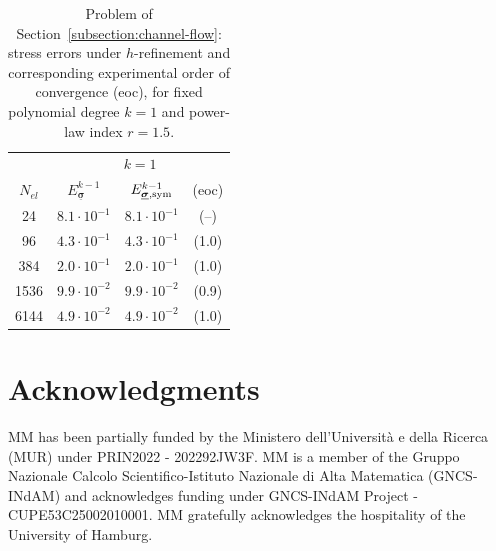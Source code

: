\documentclass[a4paper,twoside,10pt]{article}
\theoremstyle{plain}
\theoremstyle{remark}
\theoremstyle{definition}
\numberwithin{equation}{section}
\numberwithin{figure}{section}
\newcommand{\sigmabf}{\underline{\boldsymbol{\sigma}}}
\newcommand{\Ekmosigmasym}{E_{\sigmabf,\rm{sym}}^{k-1}}
\newcommand{\Ekmosigma}{E_{\sigmabf}^{k-1}}
\newcommand{\Nel}{N_{el}}
\begin{document}
\begin{table}[htbp]
\centering
\begin{tabular}{c|ccc}
\toprule
& \multicolumn{3}{c}{$k=1$}\\
$\Nel$
& $\Ekmosigma$
& $\Ekmosigmasym$
& (eoc) \\
\midrule
24
& $8.1\cdot10^{-1}$ & $8.1\cdot10^{-1}$ & (--)\\

96
& $4.3\cdot10^{-1}$ & $4.3\cdot10^{-1}$ & (1.0) \\

384
& $2.0\cdot10^{-1}$ & $2.0\cdot10^{-1}$ & (1.0) \\

1536
& $9.9\cdot10^{-2}$ & $9.9\cdot10^{-2}$ & (0.9) \\

6144
& $4.9\cdot10^{-2}$ & $4.9\cdot10^{-2}$ & (1.0) \\
\bottomrule
\end{tabular}
\caption{\footnotesize Problem of Section~\ref{subsection:channel-flow}:
        stress errors under $h$-refinement and
        corresponding experimental order of convergence (eoc),
        for fixed polynomial degree $k=1$
        and power-law index $r=1.5$.}
\label{tab:symmetry-error-channel}
\end{table}


\section*{Acknowledgments} 
MM has been partially funded by the
Ministero dell'Università e della Ricerca
(MUR)
under PRIN2022 - 202292JW3F.
MM is a member of the
Gruppo Nazionale Calcolo Scientifico-Istituto Nazionale di Alta Matematica
(GNCS-INdAM)
and acknowledges funding
under GNCS-INdAM Project - CUP{\textunderscore}E53C25002010001.
MM gratefully acknowledges the hospitality
of the University of Hamburg.
{\footnotesize
}

\end{document}

